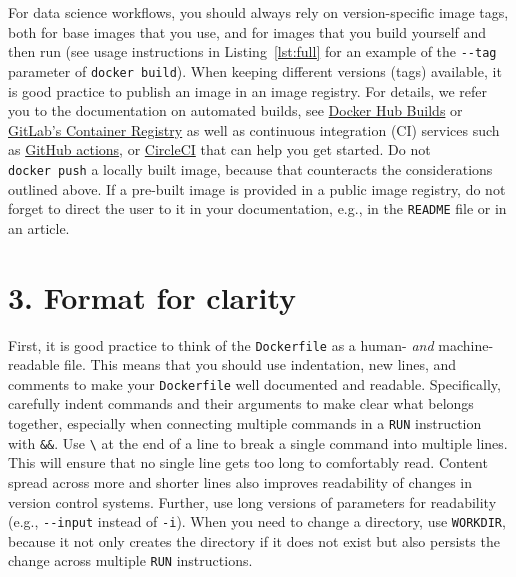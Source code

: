 \documentclass[10pt,letterpaper]{article}
\begin{document}
For data science workflows, you should always rely on version-specific
image tags, both for base images that you use, and for images that you
build yourself and then run (see usage instructions in
Listing~\ref{lst:full} for an example of the \texttt{-\/-tag} parameter
of \texttt{docker\ build}). When keeping different versions (tags)
available, it is good practice to publish an image in an image registry.
For details, we refer you to the documentation on automated builds, see
\href{https://docs.docker.com/docker-hub/builds/}{Docker Hub Builds} or
\href{https://docs.gitlab.com/ee/user/packages/container_registry/index.html\#build-and-push-images}{GitLab's
Container Registry} as well as continuous integration (CI) services such
as
\href{https://github.com/actions/starter-workflows/tree/master/ci}{GitHub
actions}, or
\href{https://circleci.com/orbs/registry/orb/circleci/docker\#commands-build}{CircleCI}
that can help you get started. Do not \texttt{docker\ push} a locally
built image, because that counteracts the considerations outlined above.
If a pre-built image is provided in a public image registry, do not
forget to direct the user to it in your documentation, e.g., in the
\texttt{README} file or in an article.

\hypertarget{format-for-clarity}{%
\section{3. Format for clarity}\label{format-for-clarity}}

  \label{rule:formatting} 
  \label{rule:clarity} 

First, it is good practice to think of the \texttt{Dockerfile} as a
human- \emph{and} machine-readable file. This means that you should use
indentation, new lines, and comments to make your \texttt{Dockerfile}
well documented and readable. Specifically, carefully indent commands
and their arguments to make clear what belongs together, especially when
connecting multiple commands in a \texttt{RUN} instruction with
\texttt{\&\&}. Use \texttt{\textbackslash{}} at the end of a line to
break a single command into multiple lines. This will ensure that no
single line gets too long to comfortably read. Content spread across
more and shorter lines also improves readability of changes in version
control systems. Further, use long versions of parameters for
readability (e.g., \texttt{-\/-input} instead of \texttt{-i}). When you
need to change a directory, use \texttt{WORKDIR}, because it not only
creates the directory if it does not exist but also persists the change
across multiple \texttt{RUN} instructions.
\end{document}
